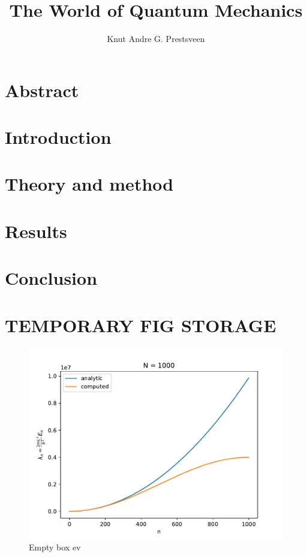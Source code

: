 \documentclass{article}
\title{The World of Quantum Mechanics}
\author{Knut Andre G. Prestsveen}
\begin{document}
\maketitle


\section{Abstract}

\section{Introduction}

\section{Theory and method}

\section{Results}

\section{Conclusion}

\section{TEMPORARY FIG STORAGE}

\begin{figure}
    \includegraphics[width=\linewidth]{./media/eigenvalues_empty_box.pdf}
    \caption{Empty box ev}
    \label{fig:box-eigenvals}
\end{figure}
\end{document}
